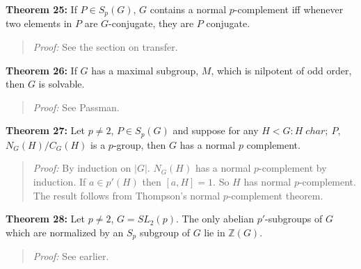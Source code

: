 {\bf Theorem 25:}
If $P \in S_p(G)$, $G$ contains a normal $p$-complement iff
whenever two elements in $P$ are $G$-conjugate, they are $P$ conjugate.
\begin{quote}
\emph{Proof:}  
See the section on transfer.
\end{quote}
{\bf Theorem 26:}
If $G$ has a maximal subgroup, $M$, which is nilpotent of odd order, then $G$ is solvable.
\begin{quote}
\emph{Proof:}  
See Passman.
\end{quote}
{\bf Theorem 27:}
Let $p \ne 2$, $P \in S_p(G)$ and suppose for any $H<G: H \; char ;\ P$, $N_G(H)/C_G(H)$ is
a $p$-group, then $G$ has a normal $p$ complement.
\begin{quote}
\emph{Proof:}  
By induction on $|G|$.  $N_G(H)$ has a normal $p$-complement by induction.
If $a \in p'(H)$ then $[a,H]=1$.  So $H$ has  normal $p$-complement.  
The result follows from Thompson's
normal $p$-complement theorem.
\end{quote}
{\bf Theorem 28:}
Let $p \ne 2$, $G= SL_2(p)$.  The only abelian $p'$-subgroups of $G$ which are normalized
by an $S_p$ subgroup of $G$ lie in ${\mathbb Z}(G)$.
\begin{quote}
\emph{Proof:}  
See earlier.
\end{quote}
